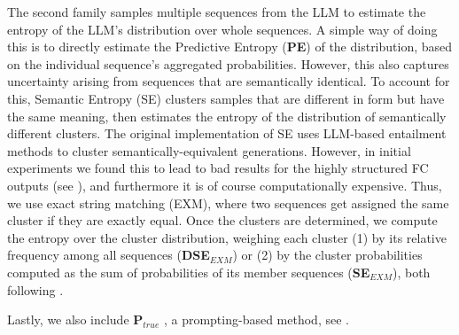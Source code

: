 The second family samples multiple sequences from the LLM to estimate the entropy of the LLM's distribution over whole sequences. 
A simple way of doing this is to directly estimate the Predictive Entropy (\textbf{PE}) of the distribution, based on the individual sequence's aggregated probabilities. 
However, this also captures uncertainty arising from sequences that are semantically identical. 
To account for this, Semantic Entropy (SE) \citep{kuhn2023semantic,farquhar2024detec} clusters samples that are different in form but have the same meaning, then estimates the entropy of the distribution of semantically different clusters. 
The original implementation of SE uses LLM-based entailment methods to cluster semantically-equivalent generations.
However, in initial experiments we found this to lead to bad results for the highly structured FC outputs (see ), and furthermore it is of course computationally expensive. 
Thus, we use exact string matching (EXM), where two sequences get assigned the same cluster if they are exactly equal. 
Once the clusters are determined, we compute the entropy over the cluster distribution, weighing each cluster (1) by its relative frequency among all sequences (\textbf{DSE}$_{EXM}$) or (2) by the cluster probabilities computed as the sum of probabilities of its member sequences (\textbf{SE}$_{EXM}$), both following \citet{farquhar2024detec}. 

Lastly, we also include \textbf{P}$_{true}$ \citep{kadavath2022languagemodelsmostlyknow}, a prompting-based method, see .









